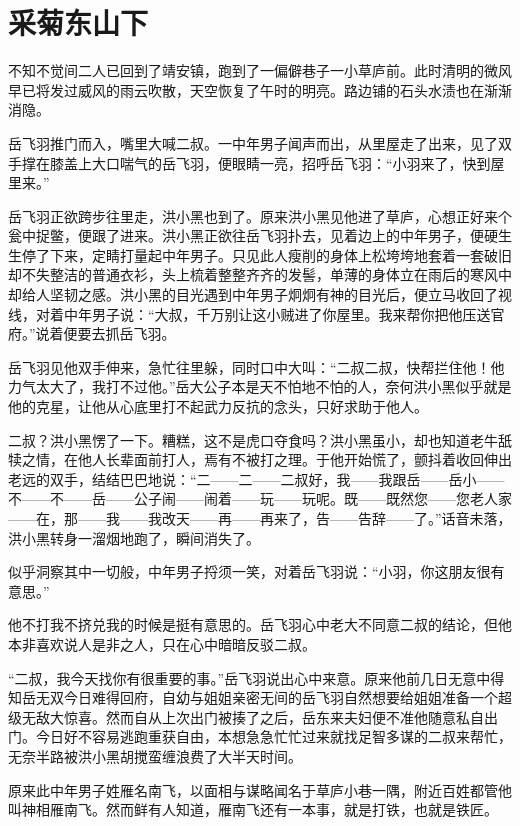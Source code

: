 \chapter{采菊东山下}
\label{chap:cai-ju-dong-nan-xia}

不知不觉间二人已回到了靖安镇，跑到了一偏僻巷子一小草庐前。此时清明的微风早已将发过威风的雨云吹散，天空恢复了午时的明亮。路边铺的石头水渍也在渐渐消隐。

岳飞羽推门而入，嘴里大喊二叔。一中年男子闻声而出，从里屋走了出来，见了双手撑在膝盖上大口喘气的岳飞羽，便眼睛一亮，招呼岳飞羽：“小羽来了，快到屋里来。”

岳飞羽正欲跨步往里走，洪小黑也到了。原来洪小黑见他进了草庐，心想正好来个瓮中捉鳖，便跟了进来。洪小黑正欲往岳飞羽扑去，见着边上的中年男子，便硬生生停了下来，定睛打量起中年男子。只见此人瘦削的身体上松垮垮地套着一套破旧却不失整洁的普通衣衫，头上梳着整整齐齐的发髻，单薄的身体立在雨后的寒风中却给人坚韧之感。洪小黑的目光遇到中年男子炯炯有神的目光后，便立马收回了视线，对着中年男子说：“大叔，千万别让这小贼进了你屋里。我来帮你把他压送官府。”说着便要去抓岳飞羽。

岳飞羽见他双手伸来，急忙往里躲，同时口中大叫：“二叔二叔，快帮拦住他！他力气太大了，我打不过他。”岳大公子本是天不怕地不怕的人，奈何洪小黑似乎就是他的克星，让他从心底里打不起武力反抗的念头，只好求助于他人。

二叔？洪小黑愣了一下。糟糕，这不是虎口夺食吗？洪小黑虽小，却也知道老牛舐犊之情，在他人长辈面前打人，焉有不被打之理。于他开始慌了，颤抖着收回伸出老远的双手，结结巴巴地说：“二------二------二叔好，我------我跟岳------岳小------不------不------岳------公子闹------闹着------玩------玩呢。既------既然您------您老人家------在，那------我------我改天------再------再来了，告------告辞------了。”话音未落，洪小黑转身一溜烟地跑了，瞬间消失了。

似乎洞察其中一切般，中年男子捋须一笑，对着岳飞羽说：“小羽，你这朋友很有意思。”

他不打我不挤兑我的时候是挺有意思的。岳飞羽心中老大不同意二叔的结论，但他本非喜欢说人是非之人，只在心中暗暗反驳二叔。

“二叔，我今天找你有很重要的事。”岳飞羽说出心中来意。原来他前几日无意中得知岳无双今日难得回府，自幼与姐姐亲密无间的岳飞羽自然想要给姐姐准备一个超级无敌大惊喜。然而自从上次出门被揍了之后，岳东来夫妇便不准他随意私自出门。今日好不容易逃跑重获自由，本想急急忙忙过来就找足智多谋的二叔来帮忙，无奈半路被洪小黑胡搅蛮缠浪费了大半天时间。

原来此中年男子姓雁名南飞，以面相与谋略闻名于草庐小巷一隅，附近百姓都管他叫神相雁南飞。然而鲜有人知道，雁南飞还有一本事，就是打铁，也就是铁匠。

